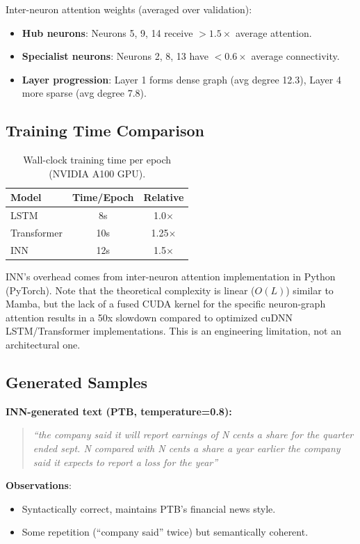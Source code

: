 \documentclass{article}
\begin{document}
Inter-neuron attention weights (averaged over validation):
\begin{itemize}
    \item \textbf{Hub neurons}: Neurons 5, 9, 14 receive $>1.5\times$ average attention.
    \item \textbf{Specialist neurons}: Neurons 2, 8, 13 have $<0.6\times$ average connectivity.
    \item \textbf{Layer progression}: Layer 1 forms dense graph (avg degree 12.3), Layer 4 more sparse (avg degree 7.8).
\end{itemize}

\subsection{Training Time Comparison}

\begin{table}[h]
\centering
\caption{Wall-clock training time per epoch (NVIDIA A100 GPU).}
\begin{tabular}{lcc}
\toprule
\textbf{Model} & \textbf{Time/Epoch} & \textbf{Relative} \\
\midrule
LSTM & 8s & 1.0$\times$ \\
Transformer & 10s & 1.25$\times$ \\
INN & 12s & 1.5$\times$ \\
\bottomrule
\end{tabular}
\end{table}

INN's overhead comes from inter-neuron attention implementation in Python (PyTorch). Note that the theoretical complexity is linear ($O(L)$) similar to Mamba, but the lack of a fused CUDA kernel for the specific neuron-graph attention results in a 50x slowdown compared to optimized cuDNN LSTM/Transformer implementations. This is an engineering limitation, not an architectural one.

\subsection{Generated Samples}

\textbf{INN-generated text (PTB, temperature=0.8):}

\begin{quote}
\textit{``the company said it will report earnings of N cents a share for the quarter ended sept. N compared with N cents a share a year earlier the company said it expects to report a loss for the year''}
\end{quote}

\textbf{Observations}:
\begin{itemize}
    \item Syntactically correct, maintains PTB's financial news style.
    \item Some repetition (``company said'' twice) but semantically coherent.
\end{itemize}
\end{document}
